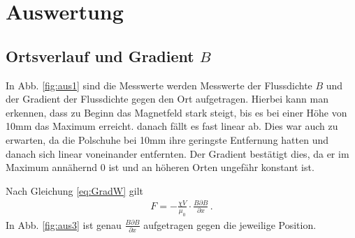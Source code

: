 \documentclass[12pt,a4paper,titlepage,headinclude,bibtotoc]{scrartcl}
\begin{document}
\section{Auswertung}
\label{sec:auswertung}
\subsection{Ortsverlauf und Gradient $B$}
In Abb. \ref{fig:aus1} sind die Messwerte werden Messwerte der Flussdichte $B$ und der Gradient der Flussdichte gegen den Ort aufgetragen.
Hierbei kann man erkennen, dass zu Beginn das Magnetfeld stark steigt, bis es bei einer Höhe von 10mm das Maximum erreicht. danach fällt es fast linear ab.
Dies war auch zu erwarten, da die Polschuhe bei 10mm ihre geringste Entfernung hatten und danach sich linear voneinander entfernten.
Der Gradient bestätigt dies, da er im Maximum annähernd 0 ist und an höheren Orten ungefähr konstant ist.

Nach Gleichung \eqref{eq:GradW} gilt
\begin{align}
	F=-\frac{\chi V}{\mu_0}\cdot\frac{B\partial B}{\partial x}\, .
\end{align}
In Abb. \ref{fig:aus3} ist genau $\frac{B\partial B}{\partial x}$ aufgetragen gegen die jeweilige Position.
\end{document}
